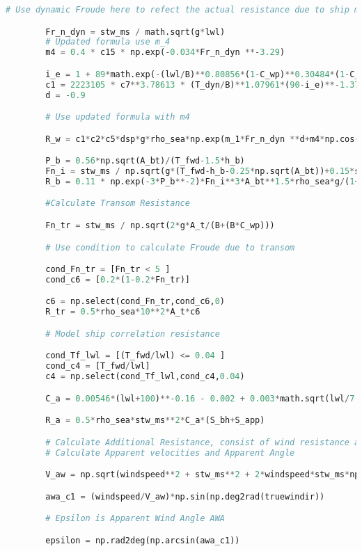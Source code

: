 \begin{lstlisting}[language=Python]
        # Use dynamic Froude here to refect the actual resistance due to ship movement 

        Fr_n_dyn = stw_ms / math.sqrt(g*lwl)
        # Updated formula use m_4
        m4 = 0.4 * c15 * np.exp(-0.034*Fr_n_dyn **-3.29)

        i_e = 1 + 89*math.exp(-(lwl/B)**0.80856*(1-C_wp)**0.30484*(1-C_p-0.0225*lcb)**0.6367*(lr/B)**0.34574*((100*dsp)/lwl**3)**0.16302)
        c1 = 2223105 * c7**3.78613 * (T_dyn/B)**1.07961*(90-i_e)**-1.37565
        d = -0.9

        # Use updated formula with m4

        R_w = c1*c2*c5*dsp*g*rho_sea*np.exp(m_1*Fr_n_dyn **d+m4*np.cos(lambda_const*Fr_n_dyn **-2))

        P_b = 0.56*np.sqrt(A_bt)/(T_fwd-1.5*h_b)
        Fn_i = stw_ms / np.sqrt(g*(T_fwd-h_b-0.25*np.sqrt(A_bt))+0.15*stw_ms**2)
        R_b = 0.11 * np.exp(-3*P_b**-2)*Fn_i**3*A_bt**1.5*rho_sea*g/(1+Fn_i**2)

        #Calculate Transom Resistance 

        Fn_tr = stw_ms / np.sqrt(2*g*A_t/(B+(B*C_wp)))

        # Use condition to calculate Froude due to transom

        cond_Fn_tr = [Fn_tr < 5 ]
        cond_c6 = [0.2*(1-0.2*Fn_tr)]

        c6 = np.select(cond_Fn_tr,cond_c6,0)
        R_tr = 0.5*rho_sea*10**2*A_t*c6

        # Model ship correlation resistance

        cond_Tf_lwl = [(T_fwd/lwl) <= 0.04 ]
        cond_c4 = [T_fwd/lwl]
        c4 = np.select(cond_Tf_lwl,cond_c4,0.04)

        C_a = 0.00546*(lwl+100)**-0.16 - 0.002 + 0.003*math.sqrt(lwl/7.5)*C_b**4*c2*(0.04-c4)

        R_a = 0.5*rho_sea*stw_ms**2*C_a*(S_bh+S_app)

        # Calculate Additional Resistance, consist of wind resistance and wave resistance
        # Calculate Apparent velocities and Apparent Angle 

        V_aw = np.sqrt(windspeed**2 + stw_ms**2 + 2*windspeed*stw_ms*np.cos(np.deg2rad(truewindir)))

        awa_c1 = (windspeed/V_aw)*np.sin(np.deg2rad(truewindir))

        # Epsilon is Apparent Wind Angle AWA

        epsilon = np.rad2deg(np.arcsin(awa_c1))


\end{lstlisting}
